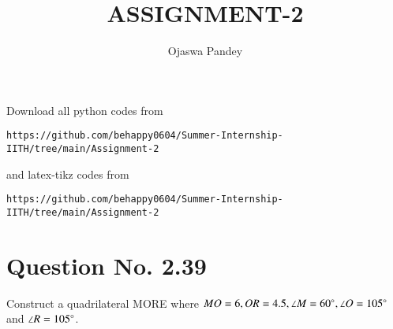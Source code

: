 \documentclass[journal,12pt,twocolumn]{IEEEtran}
\begin{document}
     \def\topbox#1{\raisebox{-\baselineskip}[0in][0in]{#1}}
     \def\midbox#1{\raisebox{-0.5\baselineskip}[0in][0in]{#1}}
\vspace{3cm}
\title{ASSIGNMENT-2}
\author{Ojaswa Pandey}
\maketitle
\newpage
\bigskip
\renewcommand{\thefigure}{\theenumi}
\renewcommand{\thetable}{\theenumi}
Download all python codes from 
\begin{lstlisting}
https://github.com/behappy0604/Summer-Internship-IITH/tree/main/Assignment-2
\end{lstlisting}
%
and latex-tikz codes from 
%
\begin{lstlisting}
https://github.com/behappy0604/Summer-Internship-IITH/tree/main/Assignment-2
\end{lstlisting}
%
\section{Question No. 2.39}
Construct a quadrilateral MORE where $MO = 6, OR = 4.5, \angle M = 60 \degree, \angle O = 105 \degree$ and $\angle R = 105 \degree$.
%
\end{document}
